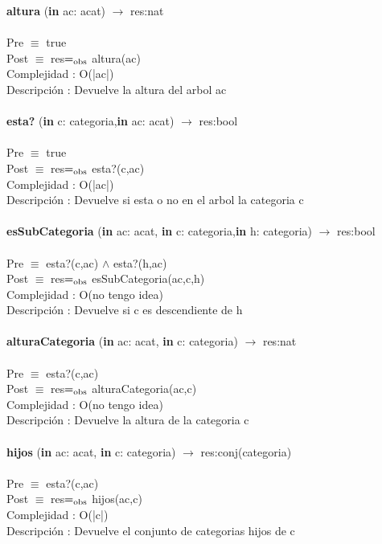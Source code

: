 \documentclass[10pt, a4paper]{article}
\begin{document}
	\textbf{altura} (\textbf{in} ac: acat) $\longrightarrow$ res:nat\\\\
	Pre $\equiv$ {true}\\
	Post $\equiv$ {res$=_{\mathrm{obs}}$ altura(ac)}\\
	Complejidad : O(|ac|)\\
	Descripci\'{o}n : Devuelve la altura del arbol ac\\\\	
	
	\textbf{esta?} (\textbf{in} c: categoria,\textbf{in} ac: acat) $\longrightarrow$ res:bool\\\\
	Pre $\equiv$ {true}\\
	Post $\equiv$ {res$=_{\mathrm{obs}}$ esta?(c,ac)}\\
	Complejidad : O(|ac|)\\
	Descripci\'{o}n : Devuelve si esta o no en el arbol la categoria c\\\\	
	
	\textbf{esSubCategoria} (\textbf{in} ac: acat, \textbf{in} c: categoria,\textbf{in} h: categoria) $\longrightarrow$ res:bool\\\\
	Pre $\equiv$ {esta?(c,ac) $\wedge$ esta?(h,ac)}\\
	Post $\equiv$ {res$=_{\mathrm{obs}}$ esSubCategoria(ac,c,h)}\\
	Complejidad : O(no tengo idea)\\
	Descripci\'{o}n : Devuelve si c es descendiente de h\\\\	
	
	\textbf{alturaCategoria} (\textbf{in} ac: acat, \textbf{in} c: categoria) $\longrightarrow$ res:nat\\\\
	Pre $\equiv$ {esta?(c,ac)}\\
	Post $\equiv$ {res$=_{\mathrm{obs}}$ alturaCategoria(ac,c)}\\
	Complejidad : O(no tengo idea)\\
	Descripci\'{o}n : Devuelve la altura de la categoria c\\\\	
	
	\textbf{hijos} (\textbf{in} ac: acat, \textbf{in} c: categoria) $\longrightarrow$ res:conj(categoria)\\\\
	Pre $\equiv$ {esta?(c,ac)}\\
	Post $\equiv$ {res$=_{\mathrm{obs}}$ hijos(ac,c)}\\
	Complejidad : O(|c|)\\
	Descripci\'{o}n : Devuelve el conjunto de categorias hijos de c\\\\	
\end{document}
